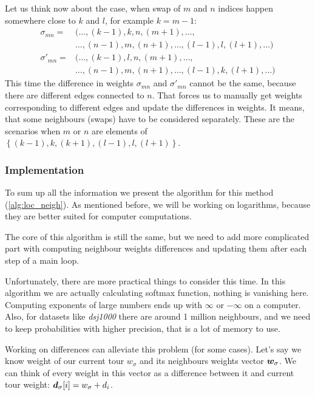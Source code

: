 		Let us think now about the case, when swap of $m$ and $n$ indices happen somewhere close to $k$ and $l$, for example $k = m-1$:
		\begin{align*}
			\sigma_{mn} = &(\ldots, (k-1), k, n, (m+1), \ldots, \\
			&\ldots, (n-1), m,( n+1), \ldots, (l-1), l, (l+1), \ldots) \\
			\sigma'_{mn} = &(\ldots, (k-1), l, n, (m+1), \ldots, \\
			& \ldots, (n-1), m, (n+1), \ldots, (l-1), k, (l+1), \ldots)
		\end{align*}
		This time the difference in weights $\sigma_{mn}$ and $\sigma'_{mn}$ cannot be the same, because there are different edges connected to $n$. That forces us to manually get weights corresponding to different edges and update the differences in weights. It means, that some neighbours (swaps) have to be considered separately. These are the scenarios when $m$ or $n$ are elements of $\left\{ (k-1), k, (k+1), (l-1), l, (l+1) \right\}$.
	
	\subsubsection{Implementation}
	
		To sum up all the information we present the algorithm for this method (\ref{alg:loc_neigh}). As mentioned before, we will be working on logarithms, because they are better suited for computer computations.

		The core of this algorithm is still the same, but we need to add more complicated part with computing neighbour weights differences and updating them after each step of a main loop.
		
		Unfortunately, there are more practical things to consider this time. In this algorithm we are actually calculating softmax function, nothing is vanishing here. Computing exponents of large numbers ends up with $\infty$ or $-\infty$ on a computer. Also, for datasets like \textit{dsj1000} there are around 1 million neighbours, and we need to keep probabilities with higher precision, that is a lot of memory to use.
		
		Working on differences can alleviate this problem (for some cases). Let's say we know weight of our current tour $w_\sigma$ and its neighbours weights vector $\bm{w}_\sigma$. We can think of every weight in this vector as a difference between it and current tour weight: $\bm{d}_{\sigma}[i] = w_\sigma + d_i$.
		
